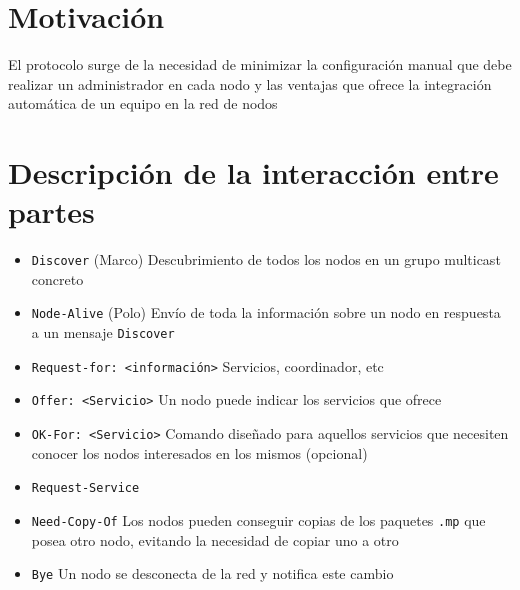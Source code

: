 \documentclass{article}
\title{\titulo}
\author{\autor}
\date{\today} %
\newcommand{\nombre}{MarcoPolo}
\begin{document}
\maketitle

\begin{abstract}
El protocolo \nombre{} permite el descubrimiento de máquinas ofreciendo una serie de servicios consumibles por el sistema distribuido, permitiendo publicar y solicitar nodos, obtener información del estado de nodos y una serie de funcionalidades de diagnóstico.
\end{abstract}

\section{Motivación}

El protocolo surge de la necesidad de minimizar la configuración manual que debe realizar un administrador en cada nodo y las ventajas que ofrece la integración automática de un equipo en la red de nodos

\section{Descripción de la interacción entre partes}

\begin{itemize}
  \item\texttt{Discover} (Marco) Descubrimiento de todos los nodos en un grupo multicast concreto
  \item\texttt{Node-Alive} (Polo) Envío de toda la información sobre un nodo en respuesta a un mensaje \texttt{Discover}
  \item\texttt{Request-for: <información>} Servicios, coordinador, etc
  \item\texttt{Offer: <Servicio>} Un nodo puede indicar los servicios que ofrece
  \item\texttt{OK-For: <Servicio>} Comando diseñado para aquellos servicios que necesiten conocer los nodos interesados en los mismos (opcional) 
  \item\texttt{Request-Service}
  \item\texttt{Need-Copy-Of} Los nodos pueden conseguir copias de los paquetes \texttt{.mp} que posea otro nodo, evitando la necesidad de copiar uno a otro 
  \item\texttt{Bye} Un nodo se desconecta de la red y notifica este cambio
\end{itemize}
\end{document}
